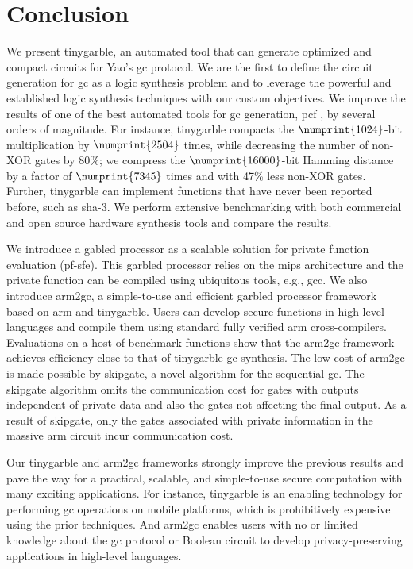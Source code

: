 \chapter{Conclusion}\label{chap:conclusion}
We present \gls{tinygarble}, an automated tool that can generate optimized and compact circuits for Yao's \acrfull{gc} protocol.
We are the first to define the circuit generation for \acrshort{gc} as a logic synthesis problem and to leverage the powerful and established logic synthesis techniques with our custom objectives.
We improve the results of one of the best automated tools for \acrshort{gc} generation, \gls{pcf} \cite{kreuter2013pcf}, by several orders of magnitude. For instance, \gls{tinygarble} compacts the $\numprint{1024}$-bit multiplication by $\numprint{2504}$ times, while decreasing the number of non-XOR gates by 80\%; we compress the $\numprint{16000}$-bit Hamming distance by a factor of $\numprint{7345}$ times and with 47\% less non-XOR gates.
Further, \gls{tinygarble} can implement functions that have never been reported before, such as \acrshort{sha}-3.
We perform extensive benchmarking with both commercial and open source hardware synthesis tools and compare the results.

We introduce a gabled processor as a scalable solution for private function evaluation (\acrshort{pf-sfe}).
This garbled processor relies on the \gls{mips} architecture and the private function can be compiled using ubiquitous tools, e.g., gcc.
We also introduce \gls{arm2gc}, a simple-to-use and efficient garbled processor framework based on \gls{arm} and \gls{tinygarble}.
Users can develop secure functions in high-level languages and compile them using standard fully verified \gls{arm} cross-compilers.
Evaluations on a host of benchmark functions show that the \gls{arm2gc} framework achieves efficiency close to that of \gls{tinygarble} \acrshort{gc} synthesis.
The low cost of \gls{arm2gc} is made possible by \gls{skipgate}, a novel algorithm for the sequential \acrshort{gc}.
The \gls{skipgate} algorithm omits the communication cost for gates with outputs independent of private data and also the gates not affecting the final output.
As a result of \gls{skipgate}, only the gates associated with private information in the massive \gls{arm} circuit incur communication cost.

Our \gls{tinygarble} and \gls{arm2gc} frameworks strongly improve the previous results and pave the way for a practical, scalable, and simple-to-use secure computation with many exciting applications.
For instance, \gls{tinygarble} is an enabling technology for performing \acrshort{gc} operations on mobile platforms, which is prohibitively expensive using the prior techniques.
And \gls{arm2gc} enables users with no or limited knowledge about the \acrshort{gc} protocol or Boolean circuit to develop privacy-preserving applications in high-level languages.

